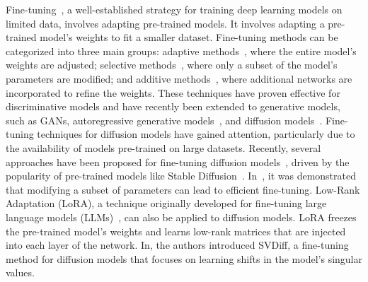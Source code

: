 Fine-tuning~\cite{fine_tunening_1,fine_tuning_1,fine_tunening_2,svdiff,lora}, a well-established strategy for training deep learning models on limited data, involves adapting pre-trained models. It involves adapting a pre-trained model's weights to fit a smaller dataset. Fine-tuning methods can be categorized into three main groups: adaptive methods~\cite{fine_tunening_1,fine_tuning3}, where the entire model's weights are adjusted; selective methods~\cite{selective_1,selective_2,selective_3}, where only a subset of the model's parameters are modified; and additive methods~\cite{lora,svdiff}, where additional networks are incorporated to refine the weights. These techniques have proven effective for discriminative models and have recently been extended to generative models, such as GANs, autoregressive generative models~\cite{lora}, and diffusion models~\cite{svdiff}. Fine-tuning techniques for diffusion models have gained attention, particularly due to the availability of models pre-trained on large datasets. Recently, several approaches have been proposed for fine-tuning diffusion models~\cite{svdiff,fine_tuning_1,lora}, driven by the popularity of pre-trained models like Stable Diffusion~\cite{stable_diffusion}. In~\cite{fine_tuning_1}, it was demonstrated that modifying a subset of parameters can lead to efficient fine-tuning. Low-Rank Adaptation (LoRA)\cite{lora}, a technique originally developed for fine-tuning large language models (LLMs)~\cite{LLMs}, can also be applied to diffusion models. LoRA freezes the pre-trained model's weights and learns low-rank matrices that are injected into each layer of the network. In\cite{svdiff}, the authors introduced SVDiff, a fine-tuning method for diffusion models that focuses on learning shifts in the model’s singular values.

